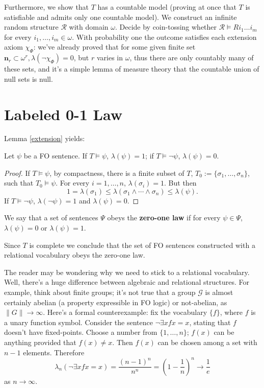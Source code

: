 Furthermore, we show that $T$ has a countable model (proving at once that $T$ is satisfiable and admits only one countable model). 
We construct an infinite random structure $\mathcal{R}$ with domain $\omega$. Decide by coin-tossing whether $\mathcal{R} \models R i_1 \ldots i_m$ for every $i_1, \ldots, i_m \in \omega$. 
With probability one the outcome satisfies each extension axiom $\chi_{\Phi}$: we've already proved that for some given finite set $\mathbf{n}_r \subset \omega^r, \lambda(\lnot \chi_{\Phi})=0 $, but $r$ varies in $\omega$, thus there are only countably many of these sets, and it's a simple lemma of measure theory that the countable union of null sets is null. 

\section{Labeled 0-1 Law}
Lemma \ref{extension} yields: 
\begin{cor} Let $\psi$ be a FO sentence. 
If $T \models \psi$, $\lambda(\psi)=1$; if $T \models \lnot \psi$, $\lambda(\psi)=0$.
\begin{proof} If $T \models \psi$, by compactness, there is a finite subset of $T$, $T_0 :=\{\sigma_1, \ldots, \sigma_n\}$, such that $T_0 \models \psi$.
For every $i=1, \ldots, n$, $\lambda(\sigma_i)=1$. 
But then 
$$1= \lambda(\sigma_1) \le \lambda(\sigma_1 \land \cdots \land \sigma_n) \le \lambda(\psi) \text{.} $$
If $T \models \lnot \psi$, $\lambda(\lnot \psi)=1$ and $\lambda(\psi)=0$. 
\end{proof} 
\end{cor}

\begin{defn} We say that a set of sentences $\Psi$ obeys the \textbf{zero-one law} if for every $\psi \in \Psi$, $\lambda(\psi)=0$ or $\lambda(\psi)=1$.
\end{defn} 

Since $T$ is complete we conclude that the set of FO sentences constructed with a relational vocabulary obeys the zero-one law. 

The reader may be wondering why we need to stick to a relational vocabulary. 
Well, there's a huge difference between algebraic and relational structures. 
For example, think about finite groups; it's not true that a group $\mathcal{G}$ is almost certainly abelian (a property expressible in FO logic) or not-abelian, as $\lVert G \rVert \to \infty$. 
Here's a formal counterexample: fix the vocabulary $\{f\}$, where $f$ is a unary function symbol. 
Consider the sentence $ \lnot \exists x f x = x$, stating that $f$ doesn't have fixed-points. 
Choose a number from $\{1, \ldots, n\}$; $f(x)$ can be anything provided that $f(x) \neq x$. 
Then $f(x)$ can be chosen among a set with $n-1$ elements. 
Therefore 
$$\lambda_n (\lnot \exists x f x = x) = \frac{(n-1)^n}{n^n} = \left ( 1- \frac{1}{n} \right )^n \to \frac{1}{e}  $$
as $n \to \infty$. 

